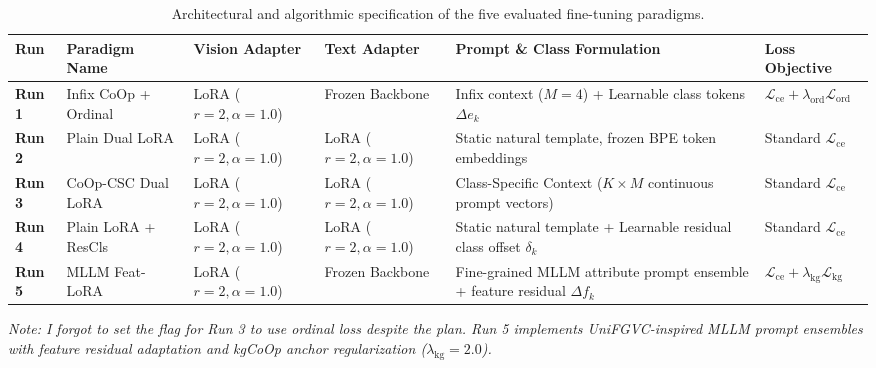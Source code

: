 \documentclass[letterpaper,11pt,leqno]{article}
\begin{document}
\begin{table}[H]
\centering
\small
\caption{Architectural and algorithmic specification of the five evaluated fine-tuning paradigms.}
\label{tab:paradigms_summary}
\begin{tabularx}{\textwidth}{l >{\raggedright\arraybackslash}p{2.6cm} >{\raggedright\arraybackslash}p{2.1cm} >{\raggedright\arraybackslash}p{2.1cm} >{\raggedright\arraybackslash}X >{\raggedright\arraybackslash}p{2.8cm}}
\toprule
\textbf{Run} & \textbf{Paradigm Name} & \textbf{Vision Adapter} & \textbf{Text Adapter} & \textbf{Prompt \& Class Formulation} & \textbf{Loss Objective} \\
\midrule
\textbf{Run 1} & Infix CoOp + Ordinal & LoRA ($r{=}2, \alpha{=}1.0$) & Frozen Backbone & Infix context ($M{=}4$) + Learnable class tokens $\Delta e_k$ & $\mathcal{L}_{\mathrm{ce}} + \lambda_{\mathrm{ord}}\mathcal{L}_{\mathrm{ord}}$ \\
\addlinespace
\textbf{Run 2} & Plain Dual LoRA & LoRA ($r{=}2, \alpha{=}1.0$) & LoRA ($r{=}2, \alpha{=}1.0$) & Static natural template, frozen BPE token embeddings & Standard $\mathcal{L}_{\mathrm{ce}}$ \\
\addlinespace
\textbf{Run 3} & CoOp-CSC Dual LoRA & LoRA ($r{=}2, \alpha{=}1.0$) & LoRA ($r{=}2, \alpha{=}1.0$) & Class-Specific Context ($K \times M$ continuous prompt vectors) & Standard $\mathcal{L}_{\mathrm{ce}}$ \\
\addlinespace
\textbf{Run 4} & Plain LoRA + ResCls & LoRA ($r{=}2, \alpha{=}1.0$) & LoRA ($r{=}2, \alpha{=}1.0$) & Static natural template + Learnable residual class offset $\delta_k$ & Standard $\mathcal{L}_{\mathrm{ce}}$ \\
\addlinespace
\textbf{Run 5} & MLLM Feat-LoRA & LoRA ($r{=}2, \alpha{=}1.0$) & Frozen Backbone & Fine-grained MLLM attribute prompt ensemble + feature residual $\Delta f_k$ & $\mathcal{L}_{\mathrm{ce}} + \lambda_{\mathrm{kg}}\mathcal{L}_{\mathrm{kg}}$ \\
\bottomrule
\end{tabularx}
\vspace{0.3em}
\raggedright\small \textit{Note: I forgot to set the flag for Run 3 to use ordinal loss despite the plan. Run 5 implements UniFGVC-inspired MLLM prompt ensembles with feature residual adaptation and kgCoOp anchor regularization ($\lambda_{\mathrm{kg}} = 2.0$).}
\end{table}
\end{document}
